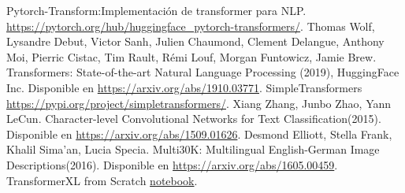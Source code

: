 \documentclass[conference]{IEEEtran}
\begin{document}
\begin{thebibliography}{00}
Pytorch-Transform:Implementaci\'on de transformer para NLP. \href{https://pytorch.org/hub/huggingface\_pytorch-transformers/}{https://pytorch.org/hub/huggingface\_pytorch-transformers/}.
Thomas Wolf, Lysandre Debut, Victor Sanh, Julien Chaumond,
Clement Delangue, Anthony Moi, Pierric Cistac, Tim Rault,
R\'emi Louf, Morgan Funtowicz, Jamie Brew. Transformers: State-of-the-art Natural
Language Processing (2019), HuggingFace Inc. Disponible en \href{https://arxiv.org/abs/1910.03771}{https://arxiv.org/abs/1910.03771}.
SimpleTransformers \href{https://pypi.org/project/simpletransformers/}{https://pypi.org/project/simpletransformers/}.
 Xiang Zhang, Junbo Zhao, Yann LeCun. 
Character-level Convolutional Networks for Text Classification(2015). Disponible en \href{https://arxiv.org/abs/1509.01626}{https://arxiv.org/abs/1509.01626}. 
 Desmond Elliott, Stella Frank, Khalil Sima'an, Lucia Specia. 
Multi30K: Multilingual English-German Image Descriptions(2016). Disponible en \href{https://arxiv.org/abs/1605.00459}{https://arxiv.org/abs/1605.00459}. 
TransformerXL from Scratch \href{https://github.com/keitakurita/Practical_NLP_in_PyTorch/blob/master/deep_dives/transformer_xl_from_scratch.ipynb}{notebook}.
\end{thebibliography}
\end{document}
